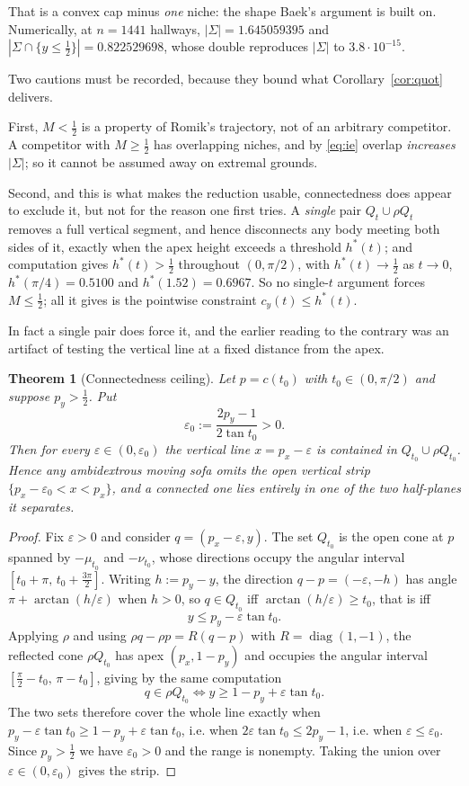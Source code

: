 \documentclass[11pt]{article}
\newtheorem{theorem}{Theorem}
\theoremstyle{definition}
\newcommand{\Sig}{\Sigma}
\begin{document}
That is a convex cap minus \emph{one} niche: the shape Baek's argument is built
on. Numerically, at $n=1441$ hallways, $|\Sig|=1.645059395$ and
$|\Sig\cap\{y\le\frac12\}|=0.822529698$, whose double reproduces $|\Sig|$ to
$3.8\cdot10^{-15}$.

Two cautions must be recorded, because they bound what
Corollary~\ref{cor:quot} delivers.

First, $M<\tfrac12$ is a property of Romik's trajectory, not of an arbitrary
competitor. A competitor with $M\ge\tfrac12$ has overlapping niches, and by
\eqref{eq:ie} overlap \emph{increases} $|\Sig|$; so it cannot be assumed away on
extremal grounds.

Second, and this is what makes the reduction usable, connectedness does
appear to exclude it, but not for the reason one first tries. A \emph{single}
pair $Q_t\cup\rho Q_t$ removes a full vertical segment, and hence disconnects any
body meeting both sides of it, exactly when the apex height exceeds a threshold
$h^\ast(t)$; and computation gives $h^\ast(t)>\tfrac12$ throughout $(0,\pi/2)$,
with $h^\ast(t)\to\tfrac12$ as $t\to0$, $h^\ast(\pi/4)=0.5100$ and
$h^\ast(1.52)=0.6967$. So no single-$t$ argument forces $M\le\tfrac12$; all it
gives is the pointwise constraint $c_y(t)\le h^\ast(t)$.

In fact a single pair does force it, and the earlier reading to the contrary was
an artifact of testing the vertical line at a fixed distance from the apex.

\begin{theorem}[Connectedness ceiling]\label{thm:ceiling}
Let $p=c(t_0)$ with $t_0\in(0,\pi/2)$ and suppose $p_y>\tfrac12$. Put
\[
  \varepsilon_0:=\frac{2p_y-1}{2\tan t_0}>0 .
\]
Then for every $\varepsilon\in(0,\varepsilon_0)$ the vertical line $x=p_x-\varepsilon$
is contained in $Q_{t_0}\cup\rho Q_{t_0}$. Hence any ambidextrous moving sofa omits
the open vertical strip $\{p_x-\varepsilon_0<x<p_x\}$, and a connected one lies
entirely in one of the two half-planes it separates.
\end{theorem}

\begin{proof}
Fix $\varepsilon>0$ and consider $q=(p_x-\varepsilon,y)$. The set $Q_{t_0}$ is the
open cone at $p$ spanned by $-\mu_{t_0}$ and $-\nu_{t_0}$, whose directions occupy
the angular interval $[t_0+\pi,\,t_0+\tfrac{3\pi}{2}]$. Writing $h:=p_y-y$, the
direction $q-p=(-\varepsilon,-h)$ has angle $\pi+\arctan(h/\varepsilon)$ when
$h>0$, so $q\in Q_{t_0}$ iff $\arctan(h/\varepsilon)\ge t_0$, that is iff
\[
  y\le p_y-\varepsilon\tan t_0 .
\]
Applying $\rho$ and using $\rho q-\rho p=R(q-p)$ with $R=\operatorname{diag}(1,-1)$,
the reflected cone $\rho Q_{t_0}$ has apex $(p_x,1-p_y)$ and occupies the angular
interval $[\tfrac\pi2-t_0,\,\pi-t_0]$, giving by the same computation
\[
  q\in\rho Q_{t_0}\iff y\ge 1-p_y+\varepsilon\tan t_0 .
\]
The two sets therefore cover the whole line exactly when
$p_y-\varepsilon\tan t_0\ge 1-p_y+\varepsilon\tan t_0$, i.e. when
$2\varepsilon\tan t_0\le 2p_y-1$, i.e. when $\varepsilon\le\varepsilon_0$. Since
$p_y>\tfrac12$ we have $\varepsilon_0>0$ and the range is nonempty. Taking the
union over $\varepsilon\in(0,\varepsilon_0)$ gives the strip.
\end{proof}
\end{document}
